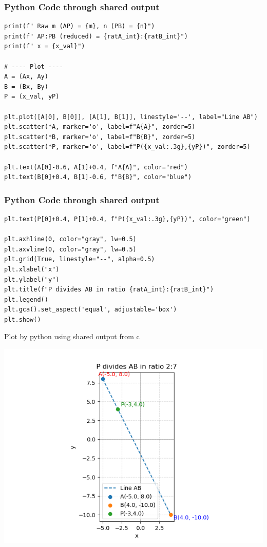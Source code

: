 \documentclass{beamer}
\begin{document}
\begin{frame}[fragile]
	\frametitle{Python Code through shared output}
	\begin{lstlisting}
print(f" Raw m (AP) = {m}, n (PB) = {n}")
print(f" AP:PB (reduced) = {ratA_int}:{ratB_int}")
print(f" x = {x_val}")

# ---- Plot ----
A = (Ax, Ay)
B = (Bx, By)
P = (x_val, yP)

plt.plot([A[0], B[0]], [A[1], B[1]], linestyle='--', label="Line AB")
plt.scatter(*A, marker='o', label=f"A{A}", zorder=5)
plt.scatter(*B, marker='o', label=f"B{B}", zorder=5)
plt.scatter(*P, marker='o', label=f"P({x_val:.3g},{yP})", zorder=5)

plt.text(A[0]-0.6, A[1]+0.4, f"A{A}", color="red")
plt.text(B[0]+0.4, B[1]-0.6, f"B{B}", color="blue")
\end{lstlisting}
\end{frame}
\begin{frame}[fragile]
	\frametitle{Python Code through shared output}
	\begin{lstlisting}
plt.text(P[0]+0.4, P[1]+0.4, f"P({x_val:.3g},{yP})", color="green")

plt.axhline(0, color="gray", lw=0.5)
plt.axvline(0, color="gray", lw=0.5)
plt.grid(True, linestyle="--", alpha=0.5)
plt.xlabel("x")
plt.ylabel("y")
plt.title(f"P divides AB in ratio {ratA_int}:{ratB_int}")
plt.legend()
plt.gca().set_aspect('equal', adjustable='box')
plt.show()
\end{lstlisting}
\end{frame}
\begin{frame}{Plot by python using shared output from c}
	\begin{center}
		\includegraphics[width=0.9\columnwidth]{figs/Figure.png}
	\end{center}
\end{frame}
\end{document}
